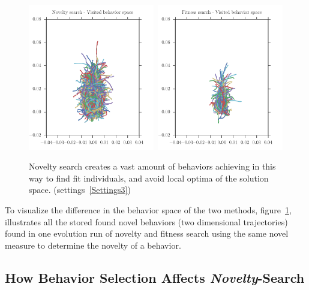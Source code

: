 \begin{figure}[t!]
\centering
\includegraphics[width=0.49\textwidth]{../Figures/Behaviors/behaviorsNovelty.pdf}\	
\includegraphics[width=0.49\textwidth]{../Figures/Behaviors/behaviorsFitness.pdf}
\caption{Novelty search creates a vast amount of behaviors achieving in this way to find fit individuals, and avoid local optima of the solution space. (settings~\ref{Settings3})}
\label{fig:behaviorSpaceDiversity}
\end{figure}

To visualize the difference in the behavior space of the two methods, figure~\ref{fig:behaviorSpaceDiversity}, illustrates all the stored found novel behaviors (two dimensional trajectories) found in one evolution run of novelty and fitness search using the same novel measure to determine the novelty of a behavior.




\subsection{How Behavior Selection Affects \emph{Novelty}-Search}

